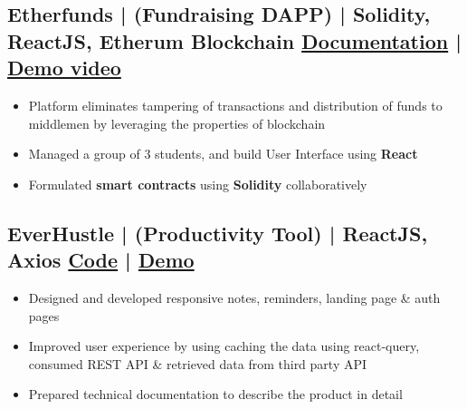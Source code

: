 \documentclass[a4,10pt]{article}
\newenvironment{zitemize}{
\begin{itemize}\itemsep0pt \parskip0pt \parsep1pt}
{\end{itemize}\vspace{-0.5cm}}
\begin{document}

\subsection*{Etherfunds {\normalsize\normalfont | (Fundraising DAPP) | Solidity, ReactJS, Etherum Blockchain } 
\hfill {\href{https://developersleague.github.io/Etherfunds/}{Documentation} } | {\href{https://youtu.be/UXFDYHBjoxo}{Demo video} }
} 
    \begin{zitemize}
        \item Platform eliminates tampering of transactions and distribution of funds to middlemen by leveraging the properties of blockchain
        \item Managed a group of 3 students, and build User Interface using \textbf{React}
        \item Formulated \textbf{smart contracts} using \textbf{Solidity} collaboratively
    \end{zitemize}

\vspace{0.1cm}

\subsection*{EverHustle {\normalsize\normalfont | (Productivity Tool) | ReactJS, Axios} \hfill {\href{https://github.com/DevelopersLeague/EverHustle-FrontEnd}{Code} }| {\href{https://everhustle.netlify.app/}{Demo} }} 
    \begin{zitemize}
        
        \item Designed and developed responsive notes, reminders, landing page \& auth pages
        \item Improved user experience by using caching the data using react-query, consumed REST API \& retrieved data
        from third party API
        \item Prepared technical documentation to describe the product in detail
    \end{zitemize}

\vspace{0.1cm}
\end{document}
